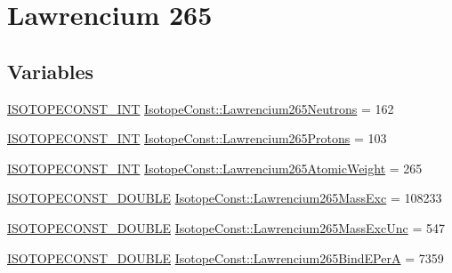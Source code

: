 \hypertarget{group___isotope_const-_lawrencium-_lr265}{}\section{Lawrencium 265}
\label{group___isotope_const-_lawrencium-_lr265}
\subsection*{Variables}
\begin{DoxyCompactItemize}
\item 
\mbox{\hyperlink{group___isotope_const-_macros_ga5f18360b3e99483a35c32d789e62621c}{I\+S\+O\+T\+O\+P\+E\+C\+O\+N\+S\+T\+\_\+\+I\+NT}} \mbox{\hyperlink{group___isotope_const-_lawrencium-_lr265_ga70e44ef0497312ba5bf6963afc361ac6}{Isotope\+Const\+::\+Lawrencium265\+Neutrons}} = 162
\item 
\mbox{\hyperlink{group___isotope_const-_macros_ga5f18360b3e99483a35c32d789e62621c}{I\+S\+O\+T\+O\+P\+E\+C\+O\+N\+S\+T\+\_\+\+I\+NT}} \mbox{\hyperlink{group___isotope_const-_lawrencium-_lr265_ga33c4e3ee8a4033db01c495810b2fc658}{Isotope\+Const\+::\+Lawrencium265\+Protons}} = 103
\item 
\mbox{\hyperlink{group___isotope_const-_macros_ga5f18360b3e99483a35c32d789e62621c}{I\+S\+O\+T\+O\+P\+E\+C\+O\+N\+S\+T\+\_\+\+I\+NT}} \mbox{\hyperlink{group___isotope_const-_lawrencium-_lr265_ga6c0929ca5699cdbe612f0abb1d03e07b}{Isotope\+Const\+::\+Lawrencium265\+Atomic\+Weight}} = 265
\item 
\mbox{\hyperlink{group___isotope_const-_macros_ga8f45a7272ce02c0b4c65c44636ed719a}{I\+S\+O\+T\+O\+P\+E\+C\+O\+N\+S\+T\+\_\+\+D\+O\+U\+B\+LE}} \mbox{\hyperlink{group___isotope_const-_lawrencium-_lr265_ga28b8d5a051bb298782e979d97a0238e6}{Isotope\+Const\+::\+Lawrencium265\+Mass\+Exc}} = 108233
\item 
\mbox{\hyperlink{group___isotope_const-_macros_ga8f45a7272ce02c0b4c65c44636ed719a}{I\+S\+O\+T\+O\+P\+E\+C\+O\+N\+S\+T\+\_\+\+D\+O\+U\+B\+LE}} \mbox{\hyperlink{group___isotope_const-_lawrencium-_lr265_ga8f0855ed3660fc85ca0fa445d015874a}{Isotope\+Const\+::\+Lawrencium265\+Mass\+Exc\+Unc}} = 547
\item 
\mbox{\hyperlink{group___isotope_const-_macros_ga8f45a7272ce02c0b4c65c44636ed719a}{I\+S\+O\+T\+O\+P\+E\+C\+O\+N\+S\+T\+\_\+\+D\+O\+U\+B\+LE}} \mbox{\hyperlink{group___isotope_const-_lawrencium-_lr265_ga3563b31372f14cb6a445a7c51c8e3512}{Isotope\+Const\+::\+Lawrencium265\+Bind\+E\+PerA}} = 7359
\item 

\end{DoxyCompactItemize}

